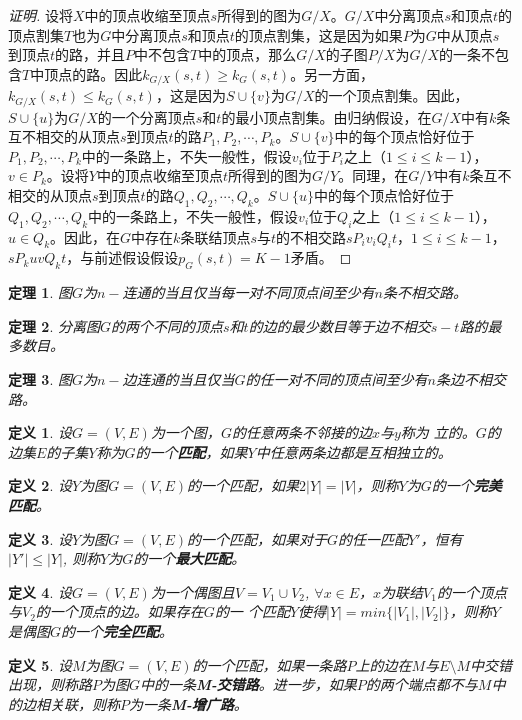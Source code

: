 \documentclass{book}[oneside]
\newtheorem{Def}{定义}[chapter]
\newtheorem{Thm}{定理}[chapter]
\begin{document}
\begin{CJK*}{UTF8}{gbsn}
\begin{proof}[证明]
    设将$X$中的顶点收缩至顶点$s$所得到的图为$G/X$。$G/X$中分离顶点$s$和顶点$t$的顶点割集$T$也为$G$中分离顶点$s$和顶点$t$的顶点割集，这是因为如果$P$为$G$中从顶点$s$到顶点$t$的路，并且$P$中不包含$T$中的顶点，那么$G/X$的子图$P/X$为$G/X$的一条不包含$T$中顶点的路。因此$k_{G/X}(s,t)\geq k_{G}(s,t)$。另一方面，$k_{G/X}(s,t)\leq k_{G}(s,t)$，这是因为$S\cup \{v\}$为$G/X$的一个顶点割集。因此，$S\cup \{u\}$为$G/X$的一个分离顶点$s$和$t$的最小顶点割集。由归纳假设，在$G/X$中有$k$条互不相交的从顶点$s$到顶点$t$的路$P_1,P_2,\cdots,P_k$。$S\cup \{v\}$中的每个顶点恰好位于$P_1,P_2,\cdots,P_k$中的一条路上，不失一般性，假设$v_i$位于$P_i$之上（$1\leq i \leq k-1$），$v\in P_k$。设将$Y$中的顶点收缩至顶点$t$所得到的图为$G/Y$。同理，在$G/Y$中有$k$条互不相交的从顶点$s$到顶点$t$的路$Q_1, Q_2, \cdots, Q_k$。$S\cup \{u\}$中的每个顶点恰好位于$Q_1,Q_2,\cdots,Q_k$中的一条路上，不失一般性，假设$v_i$位于$Q_i$之上（$1\leq i \leq k-1$），$u\in Q_k$。因此，在$G$中存在$k$条联结顶点$s$与$t$的不相交路$sP_iv_iQ_it$，$1\leq i \leq k-1$，$sP_kuvQ_kt$，与前述假设假设$p_G(s,t) = K - 1$矛盾。
  \end{proof}
  \begin{Thm}
    图$G$为$n-$连通的当且仅当每一对不同顶点间至少有$n$条不相交路。
  \end{Thm}
  \begin{Thm}
    分离图$G$的两个不同的顶点$s$和$t$的边的最少数目等于边不相交$s-t$路的最多数目。
  \end{Thm}
  \begin{Thm}
    图$G$为$n-$边连通的当且仅当$G$的任一对不同的顶点间至少有$n$条边不相交路。
  \end{Thm}
    \begin{Def}
    设$G=(V,E)$为一个图，$G$的任意两条不邻接的边$x$与$y$称为{
      立}的。$G$的边集$E$的子集$Y$称为$G$的一个{\bfseries 匹配}，如果$Y$中任意两条边都是互相独立的。
  \end{Def}

    \begin{Def}
    设$Y$为图$G=(V,E)$的一个匹配，如果$2|Y|=|V|$，则称$Y$为$G$的一个{\bfseries 完美匹配}。
  \end{Def}

      \begin{Def}
   设$Y$为图$G=(V,E)$的一个匹配，如果对于$G$的任一匹配$Y'$，恒有$|Y'|\leq |Y|$, 则称$Y$为$G$的一个{\bfseries 最大匹配}。
  \end{Def}

    \begin{Def}
    设$G=(V,E)$为一个偶图且$V=V_1\cup V_2$,
    $\forall x \in
    E$，$x$为联结$V_1$的一个顶点与$V_2$的一个顶点的边。如果存在$G$的一
    个匹配$Y$使得$|Y|=min\{|V_1|,|V_2|\}$，则称$Y$是偶图$G$的一个{\bfseries 完全匹配}。
  \end{Def}
  \begin{Def}
  设$M$为图$G=(V,E)$的一个匹配，如果一条路$P$上的边在$M$与$E\setminus M$中交错出现，则称路$P$为图$G$中的一条{\bfseries M-交错路}。进一步，如果$P$的两个端点都不与$M$中的边相关联，则称$P$为一条{\bfseries M-增广路}。
  \end{Def}



\end{CJK*}
\end{document}
